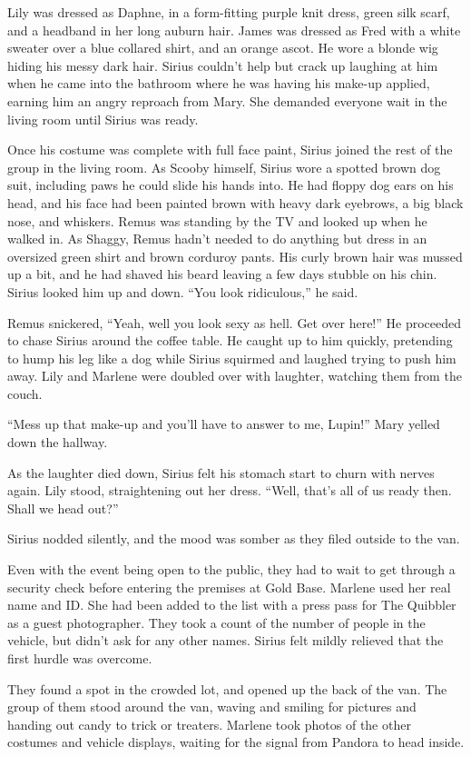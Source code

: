 \documentclass[12pt,twoside,openright]{memoir}
\begin{document}
Lily was dressed as Daphne, in a form-fitting purple knit dress, green silk scarf, and a headband in her long auburn hair. James was dressed as Fred with a white sweater over a blue collared shirt, and an orange ascot. He wore a blonde wig hiding his messy dark hair. Sirius couldn't help but crack up laughing at him when he came into the bathroom where he was having his make-up applied, earning him an angry reproach from Mary. She demanded everyone wait in the living room until Sirius was ready. 

Once his costume was complete with full face paint, Sirius joined the rest of the group in the living room. As Scooby himself, Sirius wore a spotted brown dog suit, including paws he could slide his hands into. He had floppy dog ears on his head, and his face had been painted brown with heavy dark eyebrows, a big black nose, and whiskers. Remus was standing by the TV and looked up when he walked in. As Shaggy, Remus hadn't needed to do anything but dress in an oversized green shirt and brown corduroy pants. His curly brown hair was mussed up a bit, and he had shaved his beard leaving a few days stubble on his chin. Sirius looked him up and down. ``You look ridiculous,'' he said.

Remus snickered, ``Yeah, well you look sexy as hell. Get over here!'' He proceeded to chase Sirius around the coffee table. He caught up to him quickly, pretending to hump his leg like a dog while Sirius squirmed and laughed trying to push him away. Lily and Marlene were doubled over with laughter, watching them from the couch. 

``Mess up that make-up and you'll have to answer to me, Lupin!'' Mary yelled down the hallway. 

As the laughter died down, Sirius felt his stomach start to churn with nerves again. Lily stood, straightening out her dress. ``Well, that's all of us ready then. Shall we head out?'' 

Sirius nodded silently, and the mood was somber as they filed outside to the van.

Even with the event being open to the public, they had to wait to get through a security check before entering the premises at Gold Base. Marlene used her real name and ID. She had been added to the list with a press pass for The Quibbler as a guest photographer. They took a count of the number of people in the vehicle, but didn't ask for any other names. Sirius felt mildly relieved that the first hurdle was overcome. 

They found a spot in the crowded lot, and opened up the back of the van. The group of them stood around the van, waving and smiling for pictures and handing out candy to trick or treaters. Marlene took photos of the other costumes and vehicle displays, waiting for the signal from Pandora to head inside. 
\end{document}
